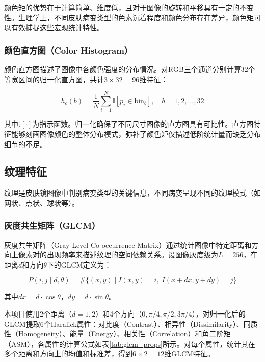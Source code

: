 \documentclass[UTF8,a4paper,12pt]{ctexart}
\numberwithin{figure}{section}
\numberwithin{table}{section}
\begin{document}
颜色矩的优势在于计算简单、维度低，且对于图像的旋转和平移具有一定的不变性。生理学上，不同皮肤病变类型的色素沉着程度和颜色分布存在差异，颜色矩可以有效捕捉这些宏观统计特性。

\subsubsection{颜色直方图（Color Histogram）}

颜色直方图描述了图像中各颜色强度的分布情况。对RGB三个通道分别计算32个等宽区间的归一化直方图，共计$3 \times 32 = 96$维特征：

\begin{equation}
h_c(b) = \frac{1}{N} \sum_{i=1}^{N} \mathbb{I}[p_i \in \text{bin}_b], \quad b = 1, 2, \ldots, 32
\end{equation}

其中$\mathbb{I}[\cdot]$为指示函数。归一化确保了不同尺寸图像的直方图具有可比性。直方图特征能够刻画图像颜色的整体分布模式，弥补了颜色矩仅描述低阶统计量而缺乏分布细节的不足。

\subsection{纹理特征}

纹理是皮肤镜图像中判别病变类型的关键信息，不同病变呈现不同的纹理模式（如网状、点状、球状等）。

\subsubsection{灰度共生矩阵（GLCM）}

灰度共生矩阵（Gray-Level Co-occurrence Matrix）通过统计图像中特定距离和方向上像素对的出现频率来描述纹理的空间依赖关系。设图像灰度级为$L=256$，在距离$d$和方向$\theta$下的GLCM定义为：

\begin{equation}
P(i, j \mid d, \theta) = \#\{(x,y) \mid I(x,y)=i,\; I(x+dx, y+dy)=j\}
\end{equation}

其中$dx = d \cdot \cos\theta$，$dy = d \cdot \sin\theta$。

本项目使用2个距离（$d=1,2$）和4个方向（$0, \pi/4, \pi/2, 3\pi/4$），对归一化后的GLCM提取6个Haralick属性：对比度（Contrast）、相异性（Dissimilarity）、同质性（Homogeneity）、能量（Energy）、相关性（Correlation）和角二阶矩（ASM），各属性的计算公式如表\ref{tab:glcm_props}所示。对每个属性，统计其在多个距离和方向上的均值和标准差，得到$6 \times 2 = 12$维GLCM特征。
\end{document}
